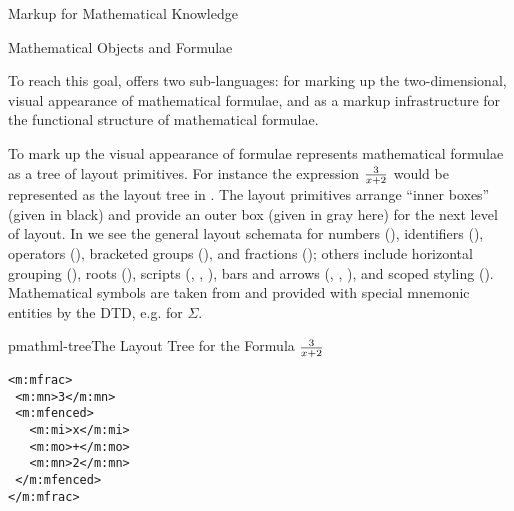 \begin{tchapter}[id=math-markup]{Markup for Mathematical Knowledge}
\begin{tsection}[id=math-objects]{Mathematical Objects and Formulae}
\begin{tsubsection}[id=math-markup:mathml]{{\mathml}}
 To reach this goal, {\mathml} offers two sub-languages: {\pmathml} for marking up the
 two-dimensional, visual appearance of mathematical formulae, and {\cmathml} as a markup
 infrastructure for the functional structure of mathematical formulae.

 To mark up the visual appearance of formulae {\pmathml} represents mathematical formulae
 as a tree of layout primitives. For instance the expression $3\over x+2$ would be
 represented as the layout tree in {}. The layout primitives
 arrange ``inner boxes'' (given in black) and provide an outer box (given in gray here)
 for the next level of layout. In {} we see the general layout
 schemata for numbers ({}), identifiers ({}),
 operators ({}), bracketed groups ({}),
 and fractions ({}); others include horizontal grouping
 ({}), roots ({}), scripts
 ({}, {}, {}),
 bars and arrows ({}, {},
 {}), and scoped {\css} styling
 ({}). Mathematical symbols are taken from {\unicode} and
 provided with special mnemonic entities by the {\mathml} DTD, e.g. {} for
 $\Sigma$.

    \begin{myfig}{pmathml-tree}{The Layout Tree for the Formula $3\over x+2$}
\begin{minipage}{2.4cm}
\begin{lstlisting}[numbers=none,frame=none]
<m:mfrac>
 <m:mn>3</m:mn>
 <m:mfenced>
   <m:mi>x</m:mi>
   <m:mo>+</m:mo>
   <m:mn>2</m:mn>
 </m:mfenced>
</m:mfrac>
\end{lstlisting}
\end{minipage}\hspace{2em}
      \begin{minipage}{8cm}
\end{minipage}
\end{myfig}
\end{tsubsection}
\end{tsection}
\end{tchapter}

